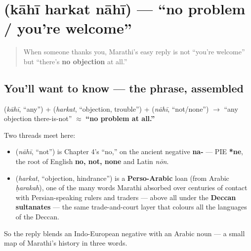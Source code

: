 \section[\texorpdfstring{\mr{काही} \mr{हरकत} \mr{नाही} (kāhī harkat nāhī)}{काही हरकत नाही (kāhī harkat nāhī)}]{   (kāhī harkat nāhī) — \textquotedblleft{}no problem / you're welcome\textquotedblright{}}

\label{lesson:MR-C03-kaahi-harkat-nahi}



\begin{quote}
When someone thanks you, Marathi's easy reply is not \textquotedblleft{}you're welcome\textquotedblright{} but \textquotedblleft{}there's \textbf{no objection} at all.\textquotedblright{}
\end{quote}

\subsection*{You'll want to know — the phrase, assembled}
\textbf{} (\emph{kāhī}, \textquotedblleft{}any\textquotedblright{}) + \textbf{} (\emph{harkat}, \textquotedblleft{}objection, trouble\textquotedblright{}) + \textbf{} (\emph{nāhī}, \textquotedblleft{}not/none\textquotedblright{}) $\to$ \textquotedblleft{}any objection there-is-not\textquotedblright{} $\approx$ \textbf{\textquotedblleft{}no problem at all.\textquotedblright{}}

\begin{cousinweb}
Two threads meet here:

\begin{itemize}
\raggedright
  \item \textbf{} (\emph{nāhī}, \textquotedblleft{}not\textquotedblright{}) is Chapter 4's \textquotedblleft{}no,\textquotedblright{} on the ancient negative \textbf{na-} — PIE \textbf{*ne}, the root of English \textbf{no, not, none} and Latin \emph{nōn}.
  \item \textbf{} (\emph{harkat}, \textquotedblleft{}objection, hindrance\textquotedblright{}) is a \textbf{Perso-Arabic} loan (from Arabic \emph{ḥarakah}), one of the many words Marathi absorbed over centuries of contact with Persian-speaking rulers and traders — above all under the \textbf{Deccan sultanates} — the same trade-and-court layer that colours all the languages of the Deccan.
\end{itemize}

So the reply blends an Indo-European negative with an Arabic noun — a small map of Marathi's history in three words.
\end{cousinweb}

